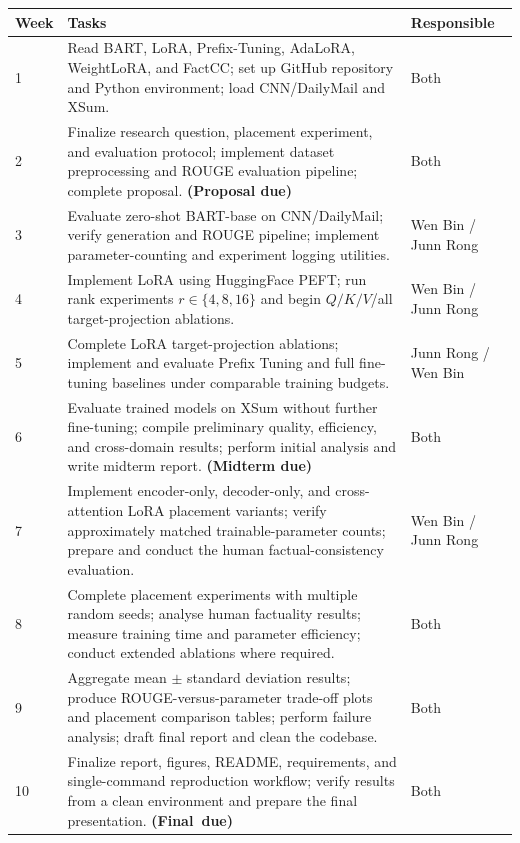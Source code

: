 \documentclass[11pt, letterpaper]{article}
\begin{document}
\begin{center}
\small
\begin{tabular}{lp{7cm}l}
\toprule
\textbf{Week} & \textbf{Tasks} & \textbf{Responsible} \\
\midrule

1 &
Read BART, LoRA, Prefix-Tuning, AdaLoRA, WeightLoRA, and FactCC;
set up GitHub repository and Python environment; load CNN/DailyMail and XSum. &
Both \\

2 &
Finalize research question, placement experiment, and evaluation protocol;
implement dataset preprocessing and ROUGE evaluation pipeline;
complete proposal. \textbf{(Proposal due)} &
Both \\

3 &
Evaluate zero-shot BART-base on CNN/DailyMail; verify generation and ROUGE
pipeline; implement parameter-counting and experiment logging utilities. &
Wen Bin / Junn Rong \\

4 &
Implement LoRA using HuggingFace PEFT; run rank experiments
$r\in\{4,8,16\}$ and begin $Q/K/V$/all target-projection ablations. &
Wen Bin / Junn Rong \\

5 &
Complete LoRA target-projection ablations; implement and evaluate Prefix
Tuning and full fine-tuning baselines under comparable training budgets. &
Junn Rong / Wen Bin \\

6 &
Evaluate trained models on XSum without further fine-tuning; compile
preliminary quality, efficiency, and cross-domain results; perform initial
analysis and write midterm report. \textbf{(Midterm due)} &
Both \\

7 &
Implement encoder-only, decoder-only, and cross-attention LoRA placement
variants; verify approximately matched trainable-parameter counts; prepare and
conduct the human factual-consistency evaluation. &
Wen Bin / Junn Rong \\

8 &
Complete placement experiments with multiple random seeds; analyse human
factuality results; measure training time and parameter efficiency; conduct
extended ablations where required. &
Both \\

9 &
Aggregate mean $\pm$ standard deviation results; produce ROUGE-versus-parameter
trade-off plots and placement comparison tables; perform failure analysis;
draft final report and clean the codebase. &
Both \\

10 &
Finalize report, figures, README, requirements, and single-command
reproduction workflow; verify results from a clean environment and prepare the
final presentation. \textbf{(Final~due)} &
Both \\

\bottomrule
\end{tabular}
\end{center}
\end{document}
